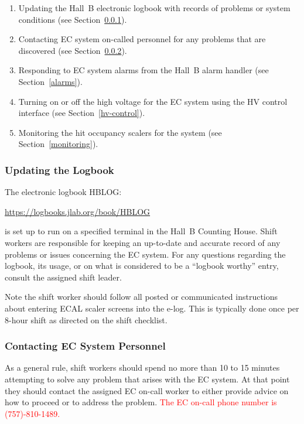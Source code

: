 \documentclass[letterpaper,10pt]{article}
\begin{document}
\begin{enumerate}
\item Updating the Hall~B electronic logbook with records of problems or system conditions (see 
Section~\ref{logbook}).

\item Contacting EC system on-called personnel for any problems that are discovered (see 
Section~\ref{contact}).

\item Responding to EC system alarms from the Hall~B alarm handler (see Section~\ref{alarms}).

\item Turning on or off the high voltage for the EC system using the HV control interface (see 
Section~\ref{hv-control}).

\item Monitoring the hit occupancy scalers for the system (see Section~\ref{monitoring}).
\end{enumerate}

\subsubsection{Updating the Logbook}
\label{logbook}

The electronic logbook HBLOG:
\begin{center}\url{https://logbooks.jlab.org/book/HBLOG}\end{center}
is set up to run on a specified terminal in the 
Hall~B Counting House. Shift workers are responsible for keeping an up-to-date and accurate record
of any problems or issues concerning the EC system. For any questions regarding the logbook, its
usage, or on what is considered to be a ``logbook worthy'' entry, consult the assigned shift leader.

Note the shift worker should follow all posted or communicated instructions about entering ECAL
scaler screens into the e-log. This is typically done once per 8-hour shift as directed on the
shift checklist.

\subsubsection{Contacting EC System Personnel}
\label{contact}

As a general rule, shift workers should spend no more than 10 to 15 minutes attempting to solve
any problem that arises with the EC system. At that point they should contact the assigned 
EC on-call worker to either provide advice on how to proceed or to address the problem. \textcolor{red}{The EC on-call phone number is (757)-810-1489.}
\end{document}
